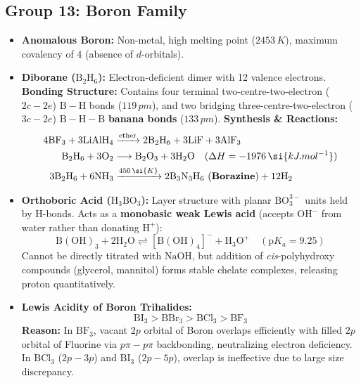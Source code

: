 \documentclass[10pt,twoside,openright]{book}
\begin{document}
\subsection{Group 13: Boron Family}
\begin{itemize}
  \item \textbf{Anomalous Boron:} Non-metal, high melting point ($2453\,\si{K}$), maximum covalency of 4 (absence of $d$-orbitals).
  \item \textbf{Diborane ($\mathrm{B_2H_6}$):}
  Electron-deficient dimer with 12 valence electrons.
  \textbf{Bonding Structure:} Contains four terminal two-centre-two-electron ($2c-2e$) $\mathrm{B-H}$ bonds ($119\,\si{pm}$), and two bridging three-centre-two-electron ($3c-2e$) $\mathrm{B-H-B}$ \textbf{banana bonds} ($133\,\si{pm}$).
  \textbf{Synthesis \& Reactions:}
  \begin{align}
    4\mathrm{BF_3} + 3\mathrm{LiAlH_4} &\xrightarrow{\text{ether}} 2\mathrm{B_2H_6} + 3\mathrm{LiF} + 3\mathrm{AlF_3} \\
    \mathrm{B_2H_6} + 3\mathrm{O_2} &\longrightarrow \mathrm{B_2O_3} + 3\mathrm{H_2O} \quad (\Delta H = -1976\,\si{kJ.mol^{-1}}) \\
    3\mathrm{B_2H_6} + 6\mathrm{NH_3} &\xrightarrow{450\,\si{K}} 2\mathrm{B_3N_3H_6}\text{ (\textbf{Borazine})} + 12\mathrm{H_2}
  \end{align}
  \item \textbf{Orthoboric Acid ($\mathrm{H_3BO_3}$):} Layer structure with planar $\mathrm{BO_3^{3-}}$ units held by H-bonds. Acts as a \textbf{monobasic weak Lewis acid} (accepts $\mathrm{OH^-}$ from water rather than donating $\mathrm{H}^+$):
  \begin{equation}
    \mathrm{B(OH)_3} + 2\mathrm{H_2O} \rightleftharpoons [\mathrm{B(OH)_4}]^- + \mathrm{H_3O}^+ \quad (\text{p}K_a = 9.25)
  \end{equation}
  Cannot be directly titrated with $\mathrm{NaOH}$, but addition of \textit{cis}-polyhydroxy compounds (glycerol, mannitol) forms stable chelate complexes, releasing proton quantitatively.
  \item \textbf{Lewis Acidity of Boron Trihalides:}
  \begin{equation}
    \mathbf{\mathrm{BI_3 > BBr_3 > BCl_3 > BF_3}}
  \end{equation}
  \textbf{Reason:} In $\mathrm{BF_3}$, vacant $2p$ orbital of Boron overlaps efficiently with filled $2p$ orbital of Fluorine via $p\pi-p\pi$ backbonding, neutralizing electron deficiency. In $\mathrm{BCl_3}$ ($2p-3p$) and $\mathrm{BI_3}$ ($2p-5p$), overlap is ineffective due to large size discrepancy.
\end{itemize}
\end{document}
